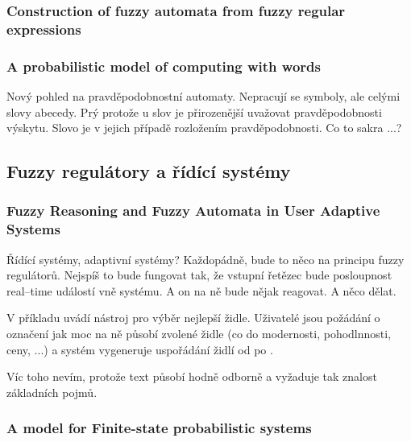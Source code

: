 \documentclass[a4paper,10pt]{article}
\begin{document}
\subsubsection*{Construction of fuzzy automata from fuzzy regular expressions \cite{StaCir-ConsFuzzAutFuzzRegExp}}

\subsubsection*{A probabilistic model of computing with words \cite{QiuWan-ProbModCompWords}}
Nový pohled na pravděpodobnostní automaty. Nepracují se symboly, ale celými slovy abecedy. Prý protože u slov je přirozenější uvažovat pravděpodobnosti výskytu. Slovo je v jejich případě rozložením pravděpodobnosti. Co to sakra ...?

\subsection{Fuzzy regulátory a řídící systémy}

\subsubsection*{Fuzzy Reasoning and Fuzzy Automata in User Adaptive Systems \cite{Kov-ReasFuzzAutInUsrAdpSyss}}

Řídící systémy, adaptivní systémy? Každopádně, bude to něco na principu fuzzy regulátorů. Nejspíš to bude fungovat tak, že vstupní řetězec bude posloupnost real--time událostí vně systému. A on na ně bude nějak reagovat. A něco dělat.

\begin{definition}
\end{definition}

V příkladu uvádí nástroj pro výběr nejlepší židle. Uživatelé jsou požádání o označení jak moc na ně působí zvolené židle (co do modernosti, pohodlnnosti, ceny, ...) a systém vygeneruje uspořádání židlí od  po .

Víc toho nevím, protože text působí hodně odborně a vyžaduje tak znalost základních pojmů.


\subsubsection*{A model for Finite-state probabilistic systems \cite{BruFu-ModelFinStateProbSyss}}
\end{document}
